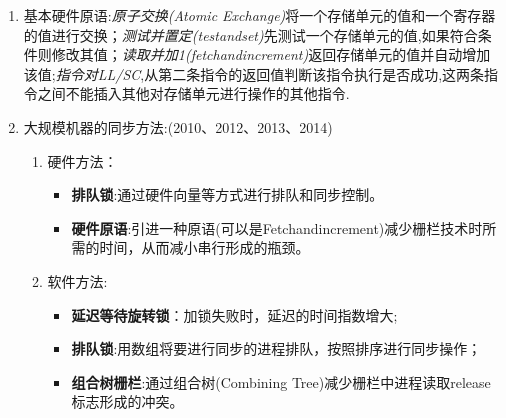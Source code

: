 \documentclass[a4paper]{ctexart}
\newcommand{\li}{\uline{\hspace{0.5em}}}
\begin{document}
\begin{enumerate}
  \item 基本硬件原语:\emph{原子交换(Atomic Exchange)}将一个存储单元的值和一个寄存器的值进行交换；\emph{测试并置定(test\li and\li set)}先测试一个存储单元的值,如果符合条件则修改其值；\emph{读取并加1(fetch\li and\li increment)}返回存储单元的值并自动增加该值;\emph{指令对LL/SC},从第二条指令的返回值判断该指令执行是否成功,这两条指令之间不能插入其他对存储单元进行操作的其他指令.
  \item 大规模机器的同步方法:(2010、2012、2013、2014)
  \begin{enumerate}
    \item 硬件方法：
    \begin{itemize}
      \item \textbf{排队锁}:通过硬件向量等方式进行排队和同步控制。
      \item \textbf{硬件原语}:引进一种原语(可以是Fetch\li and\li increment)减少栅栏技术时所需的时间，从而减小串行形成的瓶颈。
    \end{itemize}
    \item 软件方法:
    \begin{itemize}
      \item \textbf{延迟等待旋转锁}：加锁失败时，延迟的时间指数增大;
      \item \textbf{排队锁}:用数组将要进行同步的进程排队，按照排序进行同步操作；
      \item \textbf{组合树栅栏}:通过组合树(Combining Tree)减少栅栏中进程读取release标志形成的冲突。
    \end{itemize}
  \end{enumerate}
\end{enumerate}
\end{document}
